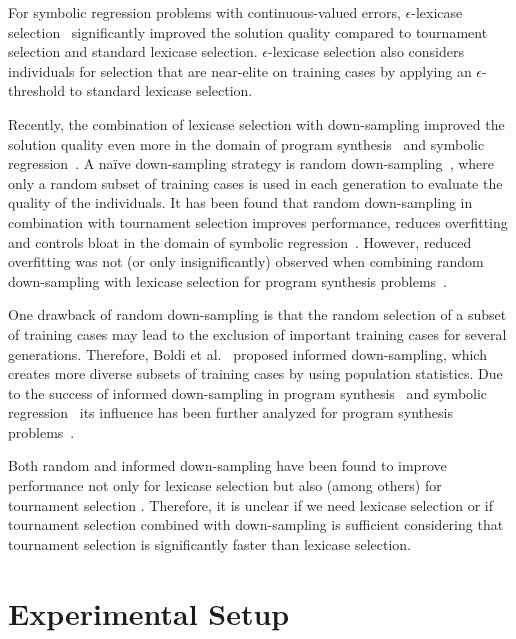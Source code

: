 \documentclass[runningheads]{llncs}
\begin{document}
For symbolic regression problems with continuous-valued errors, $\epsilon$-lexicase selection~\cite{LaCava.2016, LaCava.2019} significantly improved the solution quality compared to tournament selection and standard lexicase selection. $\epsilon$-lexicase selection also considers individuals for selection that are near-elite on training cases by applying an $\epsilon$-threshold to standard lexicase selection.

Recently, the combination of lexicase selection with down-sampling improved the solution quality even more in the domain of program synthesis~\cite{Hernandez.2019, Ferguson.2020} and symbolic regression~\cite{geiger.2023,geiger2024comprehensive,geiger2024lexicase}. A na\"ive down-sampling strategy is random down-sampling~\cite{Goncalves.2012, gonccalves2011experiments}, where only a random subset of training cases is used in each generation to evaluate the quality of the individuals.
It has been found that random down-sampling in combination with tournament selection improves performance, reduces overfitting and controls bloat in the domain of symbolic regression~\cite{Goncalves.2012, martinez2017comparison}. However, reduced overfitting was not (or only insignificantly) observed when combining random down-sampling with lexicase selection for program synthesis problems~\cite{Helmuth.2021, Schweim.2022}.

One drawback of random down-sampling is that the random selection of a subset of training cases may lead to the exclusion of important training cases for several generations. Therefore, Boldi et al.~\cite{boldi2024informed} proposed informed down-sampling, which creates more diverse subsets of training cases by using population statistics. Due to the success of informed down-sampling in program synthesis~\cite{boldi2024informed} and symbolic regression~\cite{geiger2024lexicase} its influence has been further analyzed for program synthesis problems~\cite{boldi2024untangling, Boldi2023.static, boldi2023problem}.

Both random and informed down-sampling have been found to improve performance not only for lexicase selection but also (among others) for tournament selection \cite{geiger2024lexicase, boldi2024untangling}.
Therefore, it is unclear if we need lexicase selection or if tournament selection combined with down-sampling is sufficient considering that tournament selection is significantly faster than lexicase selection.


\section{Experimental Setup}
\label{sec:experimental_setup}
\end{document}
